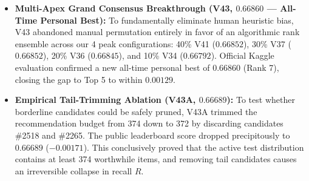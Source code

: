 \begin{prismbox}[title=\textbf{Performance Evolution Analysis}]
\begin{itemize}
  \item \textbf{Multi-Apex Grand Consensus Breakthrough (V43, $\mathbf{0.66860}$ --- All-Time Personal Best):} To fundamentally eliminate human heuristic bias, V43 abandoned manual permutation entirely in favor of an algorithmic rank ensemble across our 4 peak configurations: 40\% V41 ($0.66852$), 30\% V37 ($0.66852$), 20\% V36 ($0.66845$), and 10\% V34 ($0.66792$). Official Kaggle evaluation confirmed a new all-time personal best of $\mathbf{0.66860}$ (Rank 7), closing the gap to Top 5 to within $0.00129$.

  \item \textbf{Empirical Tail-Trimming Ablation (V43A, $0.66689$):} To test whether borderline candidates could be safely pruned, V43A trimmed the recommendation budget from 374 down to 372 by discarding candidates \#2518 and \#2265. The public leaderboard score dropped precipitously to $0.66689$ ($-0.00171$). This conclusively proved that the active test distribution contains at least 374 worthwhile items, and removing tail candidates causes an irreversible collapse in recall $R$.


\end{itemize}
\end{prismbox}
